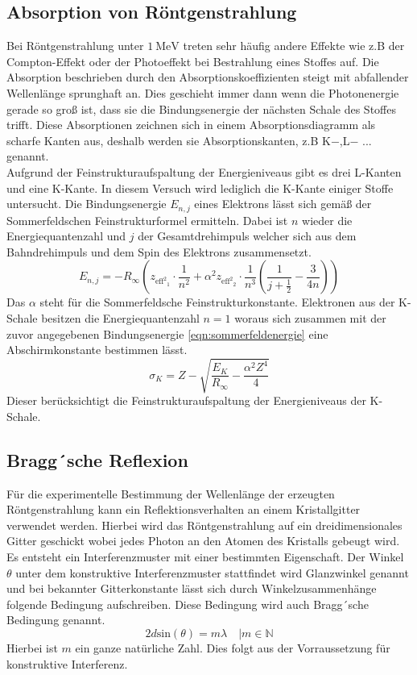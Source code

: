 \subsection{Absorption von Röntgenstrahlung}
Bei Röntgenstrahlung unter $\SI{1}{\mega\electronvolt}$ treten sehr häufig andere Effekte wie z.B der Compton-Effekt oder der Photoeffekt bei Bestrahlung eines Stoffes auf.
Die Absorption beschrieben durch den Absorptionskoeffizienten steigt mit abfallender Wellenlänge sprunghaft an. Dies geschieht immer dann wenn die Photonenergie gerade so groß ist, 
dass sie die Bindungsenergie der nächsten Schale des Stoffes trifft.
Diese Absorptionen zeichnen sich in einem Absorptionsdiagramm als scharfe Kanten aus, deshalb werden sie Absorptionskanten, z.B K${-}$,L${-}$ ... genannt.
\\
Aufgrund der Feinstrukturaufspaltung der Energieniveaus gibt es drei L-Kanten und eine K-Kante. In diesem Versuch wird lediglich die K-Kante einiger Stoffe untersucht.
Die Bindungsenergie $E_{n,j}$ eines Elektrons lässt sich gemäß der Sommerfeldschen Feinstrukturformel ermitteln. Dabei ist $n$ wieder die Energiequantenzahl und $j$ der Gesamtdrehimpuls welcher sich aus dem Bahndrehimpuls und dem
Spin des Elektrons zusammensetzt.
\begin{equation}
\label{eqn:sommerfeldenergie}
E_{n,j} = -R_{\infty} \left(z_{{{\text{eff}}^{2}}_{1}} \cdot \frac{1}{n^{2}} + {\alpha}^{2} z_{{{\text{eff}}^{2}}_{2}} \cdot \frac{1}{n^{3}} \left( \frac{1}{j + \frac{1}{2}} - \frac{3}{4n}\right)  \right)
\end{equation}
Das $\alpha$ steht für die Sommerfeldsche Feinstrukturkonstante. Elektronen aus der K-Schale besitzen die Energiequantenzahl $n = 1$ woraus sich zusammen mit der zuvor angegebenen Bindungsenergie \ref{eqn:sommerfeldenergie} eine
Abschirmkonstante bestimmen lässt.
\begin{equation}
\sigma_{K} = Z - \sqrt{\frac{E_{K}}{R_{\infty}} - \frac{{\alpha}^{2}Z^{4}}{4}}
\end{equation}
Dieser berücksichtigt die Feinstrukturaufspaltung der Energieniveaus der K-Schale.

\subsection{Bragg´sche Reflexion}
Für die experimentelle Bestimmung der Wellenlänge der erzeugten Röntgenstrahlung kann ein Reflektionsverhalten an einem Kristallgitter verwendet werden.
Hierbei wird das Röntgenstrahlung auf ein dreidimensionales Gitter geschickt wobei jedes Photon an den Atomen des Kristalls gebeugt wird. Es entsteht ein Interferenzmuster mit einer bestimmten Eigenschaft.
Der Winkel $\theta$ unter dem konstruktive Interferenzmuster stattfindet wird Glanzwinkel genannt und bei bekannter Gitterkonstante lässt sich durch Winkelzusammenhänge folgende Bedingung aufschreiben.
Diese Bedingung wird auch Bragg´sche Bedingung genannt.
\begin{equation}
\nonumber
2 d \text{sin}(\theta) =  m \lambda \quad | m \in \mathbb{N}
\end{equation}
Hierbei ist $m$ ein ganze natürliche Zahl. Dies folgt aus der Vorraussetzung für konstruktive Interferenz.